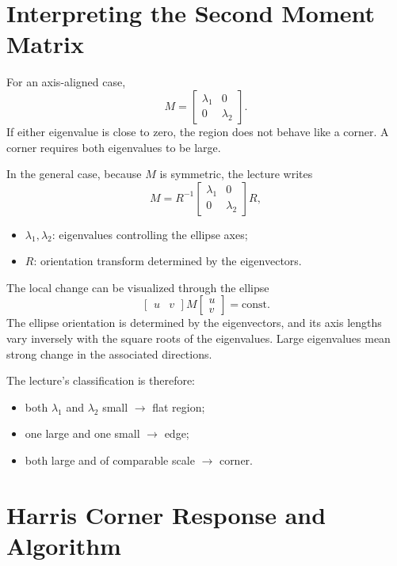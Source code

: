 \documentclass[11pt,a4paper,oneside]{report}
\newcommand{\mathlegend}[1]{%
  \par\vspace{0.2em}{\small\itshape where}\par
  \begin{itemize}[leftmargin=1.7em,topsep=0.15em,itemsep=0.12em]
  #1
  \end{itemize}
}
\begin{document}
\section{Interpreting the Second Moment Matrix}

For an axis-aligned case,
\[
M=\begin{bmatrix}\lambda_1&0\\0&\lambda_2\end{bmatrix}.
\]
If either eigenvalue is close to zero, the region does not behave like a corner. A corner requires both eigenvalues to be large.

In the general case, because $M$ is symmetric, the lecture writes
\begin{equation}
  M=R^{-1}
  \begin{bmatrix}\lambda_1&0\\0&\lambda_2\end{bmatrix}R,
  \label{eq:harris-eigendecomp}
\end{equation}
\mathlegend{
  \item $\lambda_1,\lambda_2$: eigenvalues controlling the ellipse axes;
  \item $R$: orientation transform determined by the eigenvectors.
}
The local change can be visualized through the ellipse
\begin{equation}
  \begin{bmatrix}u&v\end{bmatrix}M
  \begin{bmatrix}u\\v\end{bmatrix}=\text{const}.
  \label{eq:harris-ellipse}
\end{equation}
The ellipse orientation is determined by the eigenvectors, and its axis lengths vary inversely with the square roots of the eigenvalues. Large eigenvalues mean strong change in the associated directions.

The lecture's classification is therefore:
\begin{itemize}
  \item both $\lambda_1$ and $\lambda_2$ small $\rightarrow$ flat region;
  \item one large and one small $\rightarrow$ edge;
  \item both large and of comparable scale $\rightarrow$ corner.
\end{itemize}

\section{Harris Corner Response and Algorithm}
\end{document}
